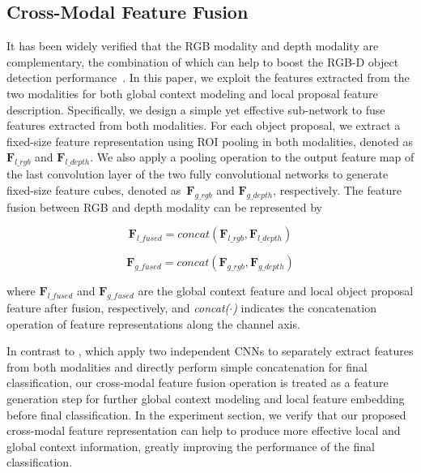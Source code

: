 \documentclass[journal]{IEEEtran}
\begin{document}
\subsection{Cross-Modal Feature Fusion}
It has been widely verified that the RGB modality and depth modality are complementary, the combination of which can help to boost the RGB-D object detection performance~\cite{gupta2014learning,gupta2016cross}. In this paper, we exploit the features extracted from the two modalities for both global context modeling and local proposal feature description. Specifically, we design a simple yet effective sub-network to fuse features extracted from both modalities. For each object proposal, we extract a fixed-size feature representation using ROI pooling \cite{fast-rcnn} in both modalities, denoted as \textit{$\bm{F}_{l\_rgb}$} and \textit{$\bm{F}_{l\_depth}$}. We also apply a pooling operation to the output feature map of the last convolution layer of the two fully convolutional networks to generate fixed-size feature cubes, denoted as~\textit{$\bm{F}_{g\_rgb}$} and \textit{$\bm{F}_{g\_depth}$}, respectively. The feature fusion between RGB and depth modality can be represented by

\begin{equation}
  \textit{$\bm{F}_{l\_fused}$} = \textit{concat}(\textit{$\bm{F}_{l\_rgb}$},        \textit{$\bm{F}_{l\_depth}$})
\end{equation}

\begin{equation}
  \textit{$\bm{F}_{g\_fused}$} = \textit{concat}(\textit{$\bm{F}_{g\_rgb}$},        \textit{$\bm{F}_{g\_depth}$})
\end{equation} 

where \textit{$\bm{F}_{l\_fused}$} and \textit{$\bm{F}_{g\_fused}$} are the global context feature and local object proposal feature after fusion, respectively, and \textit{concat($\cdot$)} indicates the concatenation operation of feature representations along the channel axis.

In contrast to \cite{gupta2014learning, gupta2016cross, song2016deep}, which apply two independent CNNs to separately extract features from both modalities and directly perform simple concatenation for final classification, our cross-modal feature fusion operation is treated as a feature generation step for further global context modeling and local feature embedding before final classification. In the experiment section, we verify that our proposed cross-modal feature representation can help to produce more effective local and global context information, greatly improving the performance of the final classification.
\end{document}
